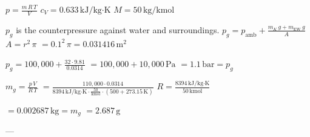 \( p = \frac{m \, R \, T}{V} \)  
\( c_V = 0.633 \, \text{kJ/kg·K} \)  
\( M = 50 \, \text{kg/kmol} \)  

\( p_g \) is the counterpressure against water and surroundings.  
\( p_g = p_{\text{amb}} + \frac{m_K \, g + m_{\text{EW}} \, g}{A} \)  
\( A = r^2 \, \pi \)  
\( = 0.1^2 \, \pi = 0.031416 \, \text{m}^2 \)  

\( p_g = 100,000 + \frac{32 \cdot 9.81}{0.0314} \)  
\( = 100,000 + 10,000 \, \text{Pa} \)  
\( = 1.1 \, \text{bar} = p_g \)  

\( m_g = \frac{p \, V}{R \, T} \)  
\( = \frac{110,000 \cdot 0.0314}{8394 \, \text{kJ/kg·K} \cdot \frac{50}{\text{kmol}} \cdot (500 + 273.15 \, \text{K})} \)  
\( R = \frac{8394 \, \text{kJ/kg·K}}{50 \, \text{kmol}} \)  

\( = 0.002687 \, \text{kg} = m_g \)  
\( = 2.687 \, \text{g} \)  

---